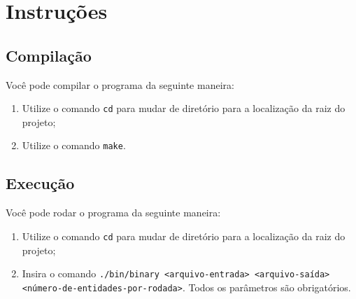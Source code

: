 \documentclass{article}
\def\code#1{\texttt{#1}}
\begin{document}
\newpage
\section*{Instruções}

\subsection*{Compilação}

Você pode compilar o programa da seguinte maneira:

\begin{enumerate}
	\item Utilize o comando \code{cd} para mudar de diretório para a localização da raiz do projeto;
	\item Utilize o comando \code{make}.
\end{enumerate}

\subsection*{Execução}

Você pode rodar o programa da seguinte maneira:

\begin{enumerate}
	\item Utilize o comando \code{cd} para mudar de diretório para a localização da raiz do projeto;
	\item Insira o comando \code{./bin/binary <arquivo-entrada> <arquivo-saída> <número-de-entidades-por-rodada>}. Todos os parâmetros são obrigatórios.
\end{enumerate}
\end{document}
